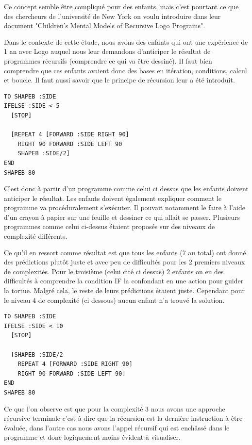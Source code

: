 Ce concept semble être compliqué pour des enfants, mais c'est pourtant ce que des chercheurs de l'université de New York on voulu introduire \cite{14} dans leur document "Children's Mental Models of Recursive Logo Programs". 

Dans le contexte de cette étude, nous avons des enfants qui ont une expérience de 1 an avec Logo auquel nous leur demandons d'anticiper le résultat de programmes récursifs (comprendre ce qui va être dessiné). Il faut bien comprendre que ces enfants avaient donc des bases en itération, conditions, calcul et boucle. Il faut aussi savoir que le principe de récursion leur a été introduit.

\begin{lstlisting}[frame=single]
TO SHAPEB :SIDE
IFELSE :SIDE < 5 
  [STOP]
  
  [REPEAT 4 [FORWARD :SIDE RIGHT 90]
	RIGHT 90 FORWARD :SIDE LEFT 90
    SHAPEB :SIDE/2]
END
SHAPEB 80
\end{lstlisting}

C'est donc à partir d'un programme comme celui ci dessus que les enfants doivent anticiper le résultat. Les enfants doivent également expliquer comment le programme va procéduralement s'exécuter. Il pouvait notamment le faire à l'aide d'un crayon à papier sur une feuille et dessiner ce qui allait se passer. Plusieurs programmes comme celui ci-dessus étaient proposés sur des niveaux de complexité différents.

\newpage

Ce qu'il en ressort comme résultat est que tous les enfants (7 au total) ont donné des prédictions plutôt juste et avec peu de difficultés pour les 2 premiers niveaux de complexités. Pour le troisième (celui cité ci dessus) 2 enfants on eu des difficultés à comprendre la condition IF la confondant en une action pour guider la tortue. Malgré cela, le reste de leurs prédictions étaient juste. 
Cependant pour le niveau 4 de complexité (ci dessous) aucun enfant n'a trouvé la solution. 

\begin{lstlisting}[frame=single]
TO SHAPEB :SIDE
IFELSE :SIDE < 10 
  [STOP]
  
  [SHAPEB :SIDE/2
    REPEAT 4 [FORWARD :SIDE RIGHT 90]
	RIGHT 90 FORWARD :SIDE LEFT 90]
END
SHAPEB 80
\end{lstlisting}

Ce que l'on observe est que pour la complexité 3 nous avons une approche récursive terminale c'est à dire que la récursion est la dernière instruction à être évaluée, dans l'autre cas nous avons l'appel récursif qui est enchâssé dans le programme et donc logiquement moins évident à visualiser.


